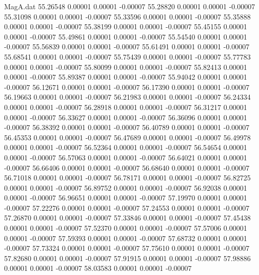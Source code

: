 \begin{filecontents}{MagA.dat}
  55.26548    0.00001    0.00001   -0.00007
  55.28820    0.00001    0.00001   -0.00007
  55.31098    0.00001    0.00001   -0.00007
  55.33596    0.00001    0.00001   -0.00007
  55.35888    0.00001    0.00001   -0.00007
  55.38199    0.00001    0.00001   -0.00007
  55.45155    0.00001    0.00001   -0.00007
  55.49861    0.00001    0.00001   -0.00007
  55.54540    0.00001    0.00001   -0.00007
  55.56839    0.00001    0.00001   -0.00007
  55.61491    0.00001    0.00001   -0.00007
  55.68541    0.00001    0.00001   -0.00007
  55.75439    0.00001    0.00001   -0.00007
  55.77783    0.00001    0.00001   -0.00007
  55.80099    0.00001    0.00001   -0.00007
  55.82413    0.00001    0.00001   -0.00007
  55.89387    0.00001    0.00001   -0.00007
  55.94042    0.00001    0.00001   -0.00007
  56.12671    0.00001    0.00001   -0.00007
  56.17390    0.00001    0.00001   -0.00007
  56.19663    0.00001    0.00001   -0.00007
  56.21983    0.00001    0.00001   -0.00007
  56.24334    0.00001    0.00001   -0.00007
  56.28918    0.00001    0.00001   -0.00007
  56.31217    0.00001    0.00001   -0.00007
  56.33627    0.00001    0.00001   -0.00007
  56.36096    0.00001    0.00001   -0.00007
  56.38392    0.00001    0.00001   -0.00007
  56.40789    0.00001    0.00001   -0.00007
  56.45353    0.00001    0.00001   -0.00007
  56.47689    0.00001    0.00001   -0.00007
  56.49978    0.00001    0.00001   -0.00007
  56.52364    0.00001    0.00001   -0.00007
  56.54654    0.00001    0.00001   -0.00007
  56.57063    0.00001    0.00001   -0.00007
  56.64021    0.00001    0.00001   -0.00007
  56.66406    0.00001    0.00001   -0.00007
  56.68640    0.00001    0.00001   -0.00007
  56.71018    0.00001    0.00001   -0.00007
  56.78171    0.00001    0.00001   -0.00007
  56.82725    0.00001    0.00001   -0.00007
  56.89752    0.00001    0.00001   -0.00007
  56.92038    0.00001    0.00001   -0.00007
  56.96651    0.00001    0.00001   -0.00007
  57.19970    0.00001    0.00001   -0.00007
  57.22276    0.00001    0.00001   -0.00007
  57.24553    0.00001    0.00001   -0.00007
  57.26870    0.00001    0.00001   -0.00007
  57.33846    0.00001    0.00001   -0.00007
  57.45438    0.00001    0.00001   -0.00007
  57.52370    0.00001    0.00001   -0.00007
  57.57006    0.00001    0.00001   -0.00007
  57.59393    0.00001    0.00001   -0.00007
  57.68732    0.00001    0.00001   -0.00007
  57.73324    0.00001    0.00001   -0.00007
  57.75610    0.00001    0.00001   -0.00007
  57.82680    0.00001    0.00001   -0.00007
  57.91915    0.00001    0.00001   -0.00007
  57.98886    0.00001    0.00001   -0.00007
  58.03583    0.00001    0.00001   -0.00007

\end{filecontents}

